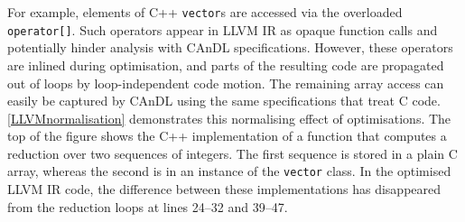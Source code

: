     For example, elements of C++ \texttt{vector}s are accessed via the
    overloaded \texttt{operator[]}.
    Such operators appear in LLVM IR as opaque function calls and potentially
    hinder analysis with CAnDL specifications.
    However, these operators are inlined during optimisation, and parts of the
    resulting code are propagated out of loops by loop-independent code motion.
    The remaining array access can easily be captured by CAnDL using the same
    specifications that treat C code.
    \autoref{LLVMnormalisation} demonstrates this normalising effect of
    optimisations.
    The top of the figure shows the C++ implementation of a function that
    computes a reduction over two sequences of integers.
    The first sequence is stored in a plain C array, whereas the second is in
    an instance of the \texttt{vector} class.
    In the optimised LLVM IR code, the difference between these implementations
    has disappeared from the reduction loops at lines 24--32 and 39--47.

